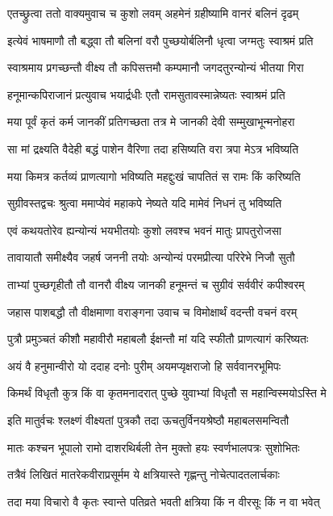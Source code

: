 \twolineshloka
{एतच्छ्रुत्वा ततो वाक्यमुवाच च कुशो लवम्}
{अहमेनं ग्रहीष्यामि वानरं बलिनं दृढम्}%

\twolineshloka
{इत्येवं भाषमाणौ तौ बद्ध्वा तौ बलिनां वरौ}
{पुच्छयोर्बलिनौ धृत्वा जग्मतुः स्वाश्रमं प्रति}%

\twolineshloka
{स्वाश्रमाय प्रगच्छन्तौ वीक्ष्य तौ कपिसत्तमौ}
{कम्पमानौ जगदतुरन्योन्यं भीतया गिरा}%

\twolineshloka
{हनूमान्कपिराजानं प्रत्युवाच भयार्द्रधीः}
{एतौ रामसुतावस्मान्नेष्यतः स्वाश्रमं प्रति}%

\twolineshloka
{मया पूर्वं कृतं कर्म जानकीं प्रतिगच्छता}
{तत्र मे जानकी देवी सम्मुखाभून्मनोहरा}%

\twolineshloka
{सा मां द्रक्ष्यति वैदेही बद्धं पाशेन वैरिणा}
{तदा हसिष्यति वरा त्रपा मेऽत्र भविष्यति}%

\twolineshloka
{मया किमत्र कर्तव्यं प्राणत्यागो भविष्यति}
{महद्दुःखं चापतितं स रामः किं करिष्यति}%

\twolineshloka
{सुग्रीवस्तद्वचः श्रुत्वा ममाप्येवं महाकपे}
{नेष्यते यदि मामेवं निधनं तु भविष्यति}%

\twolineshloka
{एवं कथयतोरेव ह्यन्योन्यं भयभीतयोः}
{कुशो लवश्च भवनं मातुः प्रापतुरोजसा}%

\twolineshloka
{तावायातौ समीक्ष्यैव जहर्ष जननी तयोः}
{अन्योन्यं परमप्रीत्या परिरेभे निजौ सुतौ}%

\twolineshloka
{ताभ्यां पुच्छगृहीतौ तौ वानरौ वीक्ष्य जानकी}
{हनूमन्तं च सुग्रीवं सर्ववीरं कपीश्वरम्}%

\twolineshloka
{जहास पाशबद्धौ तौ वीक्षमाणा वराङ्गना}
{उवाच च विमोक्षार्थं वदन्ती वचनं वरम्}%

\twolineshloka
{पुत्रौ प्रमुञ्चतं कीशौ महावीरौ महाबलौ}
{ईक्षन्तौ मां यदि स्फीतौ प्राणत्यागं करिष्यतः}%

\twolineshloka
{अयं वै हनुमान्वीरो यो ददाह दनोः पुरीम्}
{अयमप्यृक्षराजो हि सर्ववानरभूमिपः}%

\twolineshloka
{किमर्थं विधृतौ कुत्र किं वा कृतमनादरात्}
{पुच्छे युवाभ्यां विधृतौ स महान्विस्मयोऽस्ति मे}%

\twolineshloka
{इति मातुर्वचः श्लक्ष्णं वीक्ष्यतां पुत्रकौ तदा}
{ऊचतुर्विनयश्रेष्ठौ महाबलसमन्वितौ}%

\twolineshloka
{मातः कश्चन भूपालो रामो दाशरथिर्बली}
{तेन मुक्तो हयः स्वर्णभालपत्रः सुशोभितः}%

\twolineshloka
{तत्रैवं लिखितं मातरेकवीराप्रसूर्मम}
{ये क्षत्रियास्ते गृह्णन्तु नोचेत्पादतलार्चकाः}%

\twolineshloka
{तदा मया विचारो वै कृतः स्वान्ते पतिव्रते}
{भवती क्षत्रिया किं न वीरसूः किं न वा भवेत्}%

